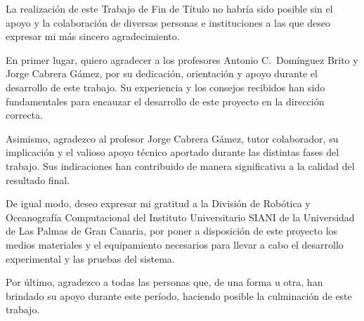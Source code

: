 \begin{flushleft}
La realización de este Trabajo de Fin de Título no habría sido posible sin el apoyo y la colaboración de diversas personas e instituciones a las que deseo expresar mi más sincero agradecimiento.

En primer lugar, quiero agradecer a los profesores Antonio C.\ Domínguez Brito y Jorge Cabrera Gámez, por su dedicación, orientación y apoyo durante el desarrollo de este trabajo. Su experiencia y los consejos recibidos han sido fundamentales para encauzar el desarrollo de este proyecto en la dirección correcta.

Asimismo, agradezco al profesor Jorge Cabrera Gámez, tutor colaborador, su implicación y el valioso apoyo técnico aportado durante las distintas fases del trabajo. Sus indicaciones han contribuido de manera significativa a la calidad del resultado final.

De igual modo, deseo expresar mi gratitud a la División de Robótica y Oceanografía Computacional del Instituto Universitario SIANI de la Universidad de Las Palmas de Gran Canaria, por poner a disposición de este proyecto los medios materiales y el equipamiento necesarios para llevar a cabo el desarrollo experimental y las pruebas del sistema.

Por último, agradezco a todas las personas que, de una forma u otra, han brindado su apoyo durante este período, haciendo posible la culminación de este trabajo.
\end{flushleft}
